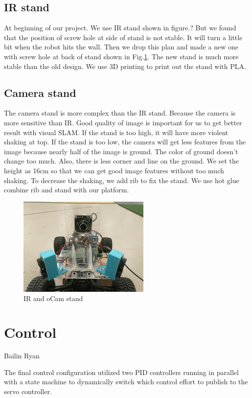 \documentclass[a4paper, 10pt, conference]{ieeeconf}      %
\begin{document}
\subsection{IR stand}
At beginning of our project. We use IR stand shown in figure.? But we found that the position of screw hole at side of stand is not stable. It will turn a little bit when the robot hits the wall. Then we drop this plan and made a new one with screw hole at back of stand shown in Fig.\ref{io fig}. The new stand is much more stable than the old design. We use 3D printing to print out the stand with PLA.
\subsection{Camera stand}

The camera stand is more complex than the IR stand. Because the camera is more sensitive than IR. Good quality of image is important for us to get better result with visual SLAM. If the stand is too high, it will have more violent shaking at top. If the stand is too low, the camera will get less features from the image because nearly half of the image is ground. The color of ground doesn’t change too much. Also, there is less corner and line on the ground. We set the height as 16cm so that we can get good image features without too much shaking. To decrease the shaking, we add rib to fix the stand. We use hot glue combine rib and stand with our platform.
\begin{figure}[htp]
    \centering
    \includegraphics{Stand.png}
    \caption{IR and oCam stand}
    \label{io fig}
\end{figure}


\section{Control}

Bailin  Ryan

The final control configuration utilized two PID controllers running in parallel with a state machine to dynamically switch which control effort to publish to the servo controller.
\end{document}
